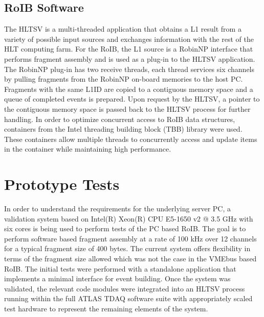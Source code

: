 \subsection{RoIB Software}\label{sec:crorc_sw}

The HLTSV is a multi-threaded application that obtains a L1 result from a variety of possible input sources and exchanges information with the 
rest of the HLT computing farm. 
For the RoIB, the L1 source is a RobinNP interface that performs fragment assembly and is used as a plug-in to the HLTSV application.
The RobinNP plug-in has two receive threads, each 
thread services six channels by pulling fragments from the RobinNP on-board memories to the host PC.
Fragments with the same L1ID are copied 
to a contiguous memory space and a queue of completed events is prepared. 
Upon request by the HLTSV, a pointer to the contiguous memory space is passed back to the 
HLTSV process for further handling. In order to optimize concurrent access to RoIB data structures, containers from the  Intel 
threading building block (TBB) library were used. These containers allow multiple threads to concurrently access and update items 
in the container while maintaining high performance.  


\section{Prototype Tests}\label{sec:perf}

In order to understand the requirements for the underlying server PC, a validation system based on Intel(R) Xeon(R) CPU E5-1650 v2 
@ 3.5 GHz with six cores is being used to perform tests of the PC based RoIB. 
The goal is to perform software based fragment assembly at a rate of 100 kHz over 12 channels for a typical 
fragment size of 400 bytes. The current system offers flexibility in terms of the fragment size allowed which was not the case in the 
VMEbus based RoIB. The initial tests were performed with a standalone application that implements a minimal interface for event building. 
Once the system was validated, the relevant code modules were integrated into an HLTSV process running within the full ATLAS TDAQ 
software suite with appropriately scaled test hardware to represent the remaining elements of the system.

